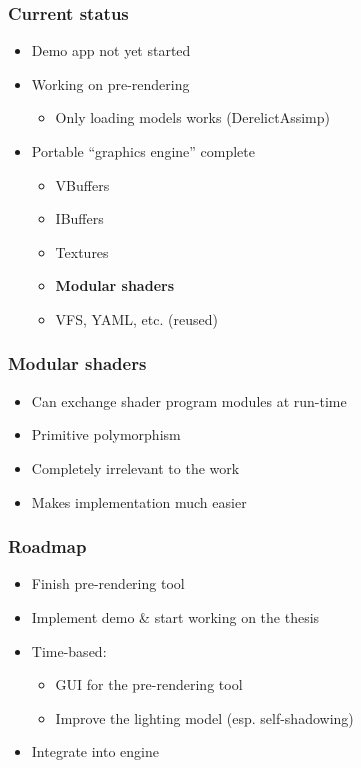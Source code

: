 \documentclass{beamer}
\begin{document}
\begin{frame}\frametitle{Current status}

\begin{itemize}
\item
  Demo app not yet started
\item
  Working on pre-rendering

  \begin{itemize}
  \item
    Only loading models works (DerelictAssimp)
  \end{itemize}
\item
  Portable ``graphics engine'' complete

  \begin{itemize}
  \item
    VBuffers
  \item
    IBuffers
  \item
    Textures
  \item
    \textbf{Modular shaders}
  \item
    VFS, YAML, etc. (reused)
  \end{itemize}
\end{itemize}

\end{frame}

\begin{frame}\frametitle{Modular shaders}

\begin{itemize}
\item
  Can exchange shader program modules at run-time
\item
  Primitive polymorphism
\item
  Completely irrelevant to the work
\item
  Makes implementation much easier
\end{itemize}

\end{frame}

\begin{frame}\frametitle{Roadmap}

\begin{itemize}
\item
  Finish pre-rendering tool
\item
  Implement demo \& start working on the thesis
\item
  Time-based:

  \begin{itemize}
  \item
    GUI for the pre-rendering tool
  \item
    Improve the lighting model (esp. self-shadowing)
  \end{itemize}
\item
  Integrate into engine
\end{itemize}

\end{frame}
\end{document}
